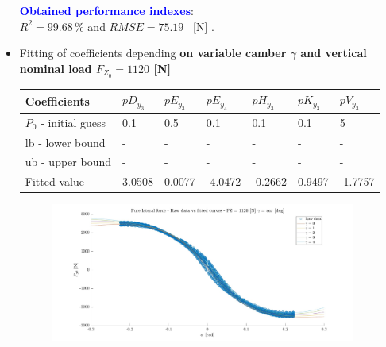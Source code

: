 \documentclass{IEEEtran}
\begin{document}
\begin{itemize}
            

            \textbf{\textcolor{blue}{Obtained performance indexes}}: \\ $R^{2} = 99.68 \, \%$ and $RMSE = 75.19 $ \, [N] .
            \newpage
            \item Fitting of coefficients depending \textbf{on variable camber $\gamma$ and vertical nominal load $F_{Z_0} = 1120$ [N]}
            
                \begin{table}[htbp]
                \begin{adjustbox}{width=\columnwidth,center}
                    \begin{tabular}{|l|l|l|l|l|l|l|}
                    \hline
                    Coefficients       & $pD_{y_3}$    & $pE_{y_3}$       & $pE_{y_4}$        & $pH_{y_3}$ & $pK_{y_3}$ & $pV_{y_3}$    \\
                    \hline
                    $P_0$ - initial guess & 0.1  & 0.5        & 0.1         & 0.1 & 0.1 & 5   \\ \hline
                    lb - lower bound   & -   & -          & -       & - & - & -  \\ \hline
                    ub - upper bound   & -    & -          & -        & - & - & -   \\ \hline
                    Fitted value       & 3.0508 & 0.0077 & -4.0472 & -0.2662 & 0.9497 & -1.7757 \\ \hline
                    \end{tabular}
                    \end{adjustbox}
                \end{table}
                
                \begin{figure}[htbp]
                    \centerline{\includegraphics[width = 3.95in]{pure_lateral_3.jpg}}
                    
                    \label{fig:Fy0gam}
                \end{figure}
                

\end{itemize}
\end{document}

